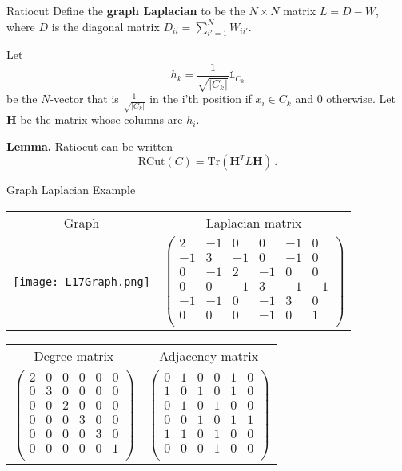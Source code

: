 \documentclass[10pt, table, dvipsnames,xcdraw, handout]{beamer}
\begin{document}
\begin{frame}[fragile]{Ratiocut}
Define the \textbf{graph Laplacian} to be the $N\times N$ matrix $L = D-W$, where $D$ is the diagonal matrix $D_{ii} = \sum_{i'=1}^N W_{ii'}$. \pause 

Let 
$$
h_k  = \frac{1}{\sqrt{|C_k|}} \mathds{1}_{C_k}
$$ 
be the $N$-vector that is $ \frac{1}{\sqrt{|C_k|}} $ in the i'th position if $x_i\in C_k$ and $0$ otherwise. \pause Let $\mathbf{H}$ be the matrix whose columns are $h_i$. \pause

\textbf{Lemma.} Ratiocut can be written
$$
\text{RCut}(C)  = \text{Tr}(\mathbf{H}^TL\mathbf{H})\,.
$$
\end{frame}



\begin{frame}[fragile]{Graph Laplacian Example}
\begin{table}[]
\small
\begin{tabular}{cc}
Graph&Laplacian matrix
\\
\texttt{[image: L17Graph.png]} 
&
$
\left(\begin{array}{rrrrrr}
   2 & -1 &  0 &  0 & -1 &  0\\
  -1 &  3 & -1 &  0 & -1 &  0\\
   0 & -1 &  2 & -1 &  0 &  0\\
   0 &  0 & -1 &  3 & -1 & -1\\
  -1 & -1 &  0 & -1 &  3 &  0\\
   0 &  0 &  0 & -1 &  0 &  1\\
\end{array}\right)
$
\end{tabular}
\end{table}
\begin{table}[]
\small
\begin{tabular}{cc}
Degree matrix & Adjacency matrix
\\
$
\left(
\begin{array}{rrrrrr}
  2 &  0 &  0 &  0 &  0 &  0\\
  0 &  3 &  0 &  0 &  0 &  0\\
  0 &  0 &  2 &  0 &  0 &  0\\
  0 &  0 &  0 &  3 &  0 &  0\\
  0 &  0 &  0 &  0 &  3 &  0\\
  0 &  0 &  0 &  0 &  0 &  1\\
\end{array}\right)
$
&
$
\left(\begin{array}{rrrrrr}
  0 &  1 &  0 &  0 &  1 &  0\\
  1 &  0 &  1 &  0 &  1 &  0\\
  0 &  1 &  0 &  1 &  0 &  0\\
  0 &  0 &  1 &  0 &  1 &  1\\
  1 &  1 &  0 &  1 &  0 &  0\\
  0 &  0 &  0 &  1 &  0 &  0\\
\end{array}\right)
$
\end{tabular}
\end{table}
\end{frame}
\end{document}
